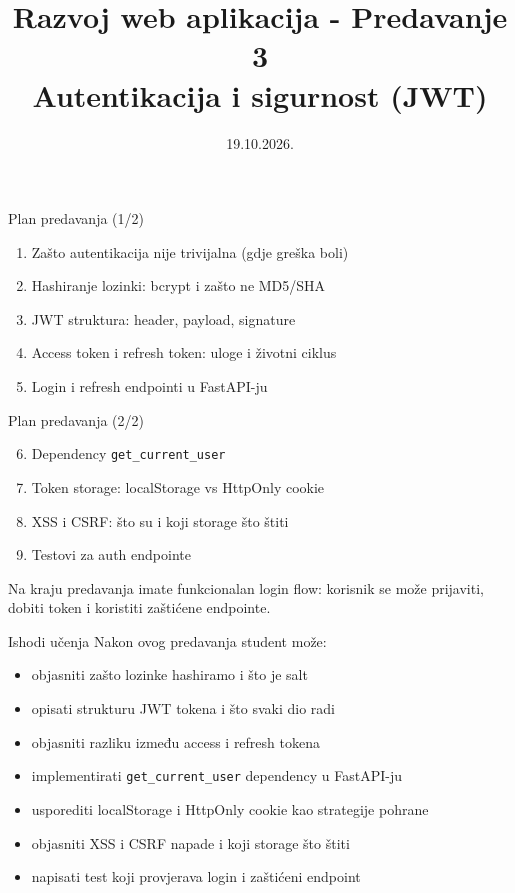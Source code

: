 

\title[Razvoj web aplikacija]{Razvoj web aplikacija - Predavanje 3 \\ Autentikacija i sigurnost (JWT)}
\date{19.10.2026.}



\frame{\titlepage}

\begin{frame}{Plan predavanja (1/2)}
	\begin{enumerate}
		\item Zašto autentikacija nije trivijalna (gdje greška boli)
		\item Hashiranje lozinki: bcrypt i zašto ne MD5/SHA
		\item JWT struktura: header, payload, signature
		\item Access token i refresh token: uloge i životni ciklus
		\item Login i refresh endpointi u FastAPI-ju
	\end{enumerate}
\end{frame}

\begin{frame}{Plan predavanja (2/2)}
	\begin{enumerate}
		\setcounter{enumi}{5}
		\item Dependency \texttt{get\_current\_user}
		\item Token storage: localStorage vs HttpOnly cookie
		\item XSS i CSRF: što su i koji storage što štiti
		\item Testovi za auth endpointe
	\end{enumerate}

	\vspace{0.6em}
	Na kraju predavanja imate funkcionalan login flow: korisnik se može prijaviti, dobiti token i koristiti zaštićene endpointe.
\end{frame}

\begin{frame}{Ishodi učenja}
	Nakon ovog predavanja student može:
	\begin{itemize}
		\item objasniti zašto lozinke hashiramo i što je salt
		\item opisati strukturu JWT tokena i što svaki dio radi
		\item objasniti razliku između access i refresh tokena
		\item implementirati \texttt{get\_current\_user} dependency u FastAPI-ju
		\item usporediti localStorage i HttpOnly cookie kao strategije pohrane
		\item objasniti XSS i CSRF napade i koji storage što štiti
		\item napisati test koji provjerava login i zaštićeni endpoint
	\end{itemize}
\end{frame}


